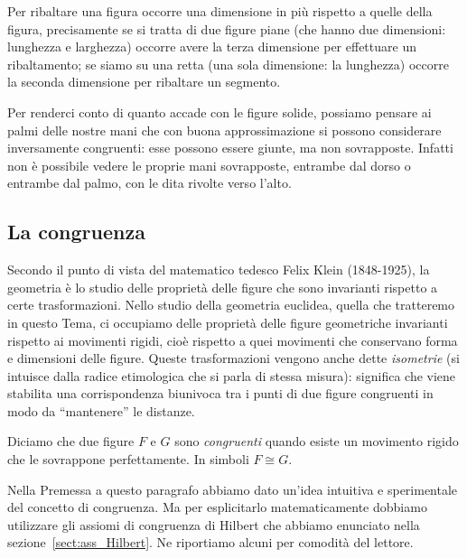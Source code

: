 \begin{figure}[htb]
\centering\label{fig:figure_i_j}
\end{figure}

\osservazione Per ribaltare una figura occorre una dimensione in più rispetto a quelle della figura, precisamente se si tratta di due figure piane (che hanno due dimensioni: lunghezza e larghezza)  occorre avere la terza dimensione per effettuare un ribaltamento; se siamo su una retta (una sola dimensione: la lunghezza) occorre la seconda dimensione per ribaltare un segmento.

Per renderci conto di quanto accade con le figure solide, possiamo pensare ai palmi delle nostre mani che con buona approssimazione si possono considerare inversamente congruenti: esse possono essere giunte, ma non sovrapposte. Infatti non è possibile vedere le proprie mani sovrapposte, entrambe dal dorso o entrambe dal palmo, con le dita rivolte verso l'alto.

\subsection{La congruenza}

Secondo il punto di vista del matematico tedesco Felix Klein (1848-1925), la geometria è lo studio delle proprietà delle figure che sono invarianti rispetto a certe trasformazioni. Nello studio della geometria euclidea, quella che tratteremo in questo Tema, ci occupiamo delle proprietà delle figure geometriche invarianti rispetto ai movimenti rigidi, cioè rispetto a quei movimenti che conservano forma e dimensioni delle figure. Queste trasformazioni vengono anche dette \emph{isometrie} (si intuisce dalla radice etimologica che si parla di stessa misura): significa che viene stabilita una corrispondenza biunivoca tra i punti di due figure congruenti in modo da ``mantenere'' le distanze.

\begin{definizione}
Diciamo che due figure $F$ e $G$ sono \emph{congruenti} quando esiste un movimento rigido che le sovrappone perfettamente. In simboli $F\cong G$.
\end{definizione}

Nella Premessa a questo paragrafo abbiamo dato un'idea intuitiva e sperimentale del concetto di congruenza. Ma per esplicitarlo matematicamente dobbiamo utilizzare gli assiomi di congruenza di Hilbert che abbiamo enunciato nella sezione~\ref{sect:ass_Hilbert}. Ne riportiamo alcuni per comodità del lettore.


